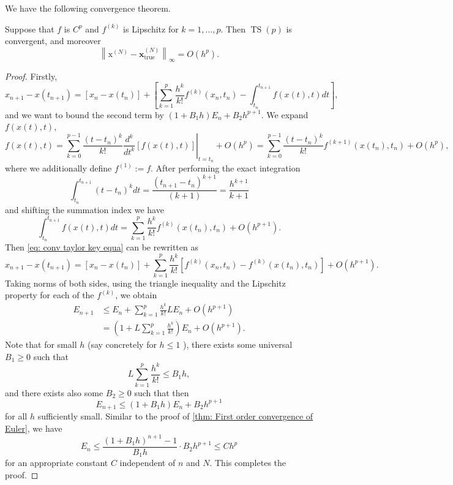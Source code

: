 We have the following convergence theorem. 
\newpage 
\begin{theorem}
\label{thm: Convergence of Taylor series method}
Suppose that $f$ is $C^p$ and $f^{(k)}$ is Lipschitz for $k=1, \ldots, p$. Then $\operatorname{TS}(p)$ is convergent, and moreover 
\[
    \left\|\mathrm{x}^{(N)}-\mathbf{x}_{\mathrm{true}}^{(N)}\right\|_{\infty}=O\left(h^p\right).
\]
\end{theorem}
\begin{proof}
Firstly, 
\begin{equation}
\label{eq: conv taylor key equa}
x_{n+1}-x\left(t_{n+1}\right)=\left[x_n-x\left(t_n\right)\right]+\left[\sum_{k=1}^p \frac{h^k}{k !} f^{(k)}\left(x_n, t_n\right)-\int_{t_n}^{t_{n+1}} f(x(t), t) d t\right],
\end{equation}
and we want to bound the second term by $ (1+B_1h) E_n + B_2 h^{p+1} $. We expand $ f(x(t),t) $, 
\[
    f(x(t), t)=\left.\sum_{k=0}^{p-1} \frac{\left(t-t_n\right)^k}{k !} \frac{d^k}{d t^k}[f(x(t), t)]\right|_{t=t_n}+O\left(h^p\right) = \sum_{k=0}^{p-1} \frac{\left(t-t_n\right)^k}{k !} f^{(k+1)}\left(x\left(t_n\right), t_n\right)+O\left(h^p\right), 
\]
where we additionally define $f^{(1)}:=f$. After performing the exact integration
$$
\int_{t_n}^{t_{n+1}}\left(t-t_n\right)^k d t=\frac{\left(t_{n+1}-t_n\right)^{k+1}}{(k+1)}=\frac{h^{k+1}}{k+1}
$$
and shifting the summation index we have
$$
\int_{t_n}^{t_{n+1}} f(x(t), t) d t=\sum_{k=1}^p \frac{h^k}{k !} f^{(k)}\left(x\left(t_n\right), t_n\right)+O\left(h^{p+1}\right) .
$$
Then \eqref{eq: conv taylor key equa} can be rewritten as
$$
x_{n+1}-x\left(t_{n+1}\right)=\left[x_n-x\left(t_n\right)\right]+\sum_{k=1}^p \frac{h^k}{k !}\left[f^{(k)}\left(x_n, t_n\right)-f^{(k)}\left(x\left(t_n\right), t_n\right)\right]+O\left(h^{p+1}\right) .
$$
Taking norms of both sides, using the triangle inequality and the Lipschitz property for each of the $f^{(k)}$, we obtain
$$
\begin{aligned}
E_{n+1} & \leq E_n+\sum_{k=1}^p \frac{h^k}{k !} L E_n+O\left(h^{p+1}\right) \\
& =\left(1+L \sum_{k=1}^p \frac{h^k}{k !}\right) E_n+O\left(h^{p+1}\right) .
\end{aligned}
$$
Note that for small $h$ (say concretely for $h \leq 1$ ), there exists some universal $B_1 \geq 0$ such that
$$
L \sum_{k=1}^p \frac{h^k}{k !} \leq B_1 h,
$$
and there exists also some $B_2 \geq 0$ such that then
$$
E_{n+1} \leq\left(1+B_1 h\right) E_n+B_2 h^{p+1}
$$
for all $h$ sufficiently small. Similar to the proof of \autoref{thm: First order convergence of Euler}, we have 
$$
E_n \leq \frac{\left(1+B_1 h\right)^{n+1}-1}{B_1 h} \cdot B_2 h^{p+1} \leq C h^p
$$
for an appropriate constant $C$ independent of $n$ and $N$. This completes the proof.
\end{proof}

